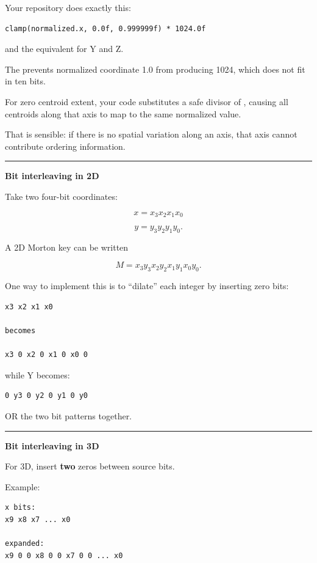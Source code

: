 Your repository does exactly this:

\begin{verbatim}
clamp(normalized.x, 0.0f, 0.999999f) * 1024.0f
\end{verbatim}

and the equivalent for Y and Z.

The  prevents normalized coordinate 1.0 from producing 1024, which does not fit in ten bits.

For zero centroid extent, your code substitutes a safe divisor of , causing all centroids along that axis to map to the same normalized value.

That is sensible: if there is no spatial variation along an axis, that axis cannot contribute ordering information.

\begin{center}\rule{0.5\linewidth}{0.5pt}\end{center}

\textbf{Bit interleaving in 2D}

Take two four-bit coordinates:

\[
x=x_3x_2x_1x_0
\]

\[
y=y_3y_2y_1y_0.
\]

A 2D Morton key can be written

\[
M=
x_3y_3x_2y_2x_1y_1x_0y_0.
\]

One way to implement this is to ``dilate'' each integer by inserting zero bits:

\begin{verbatim}
x3 x2 x1 x0

becomes

x3 0 x2 0 x1 0 x0 0
\end{verbatim}

while Y becomes:

\begin{verbatim}
0 y3 0 y2 0 y1 0 y0
\end{verbatim}

OR the two bit patterns together.

\begin{center}\rule{0.5\linewidth}{0.5pt}\end{center}

\textbf{Bit interleaving in 3D}

For 3D, insert \textbf{two} zeros between source bits.

Example:

\begin{verbatim}
x bits:
x9 x8 x7 ... x0

expanded:
x9 0 0 x8 0 0 x7 0 0 ... x0
\end{verbatim}

